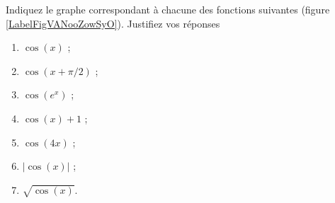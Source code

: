 
\begin{exercice}\label{exostarterST-0007}


Indiquez le graphe correspondant à chacune des fonctions suivantes (figure \ref{LabelFigVANooZowSyO}). Justifiez vos réponses
  \begin{multicols}{3}
    \begin{enumerate}
    \item $\cos (x) $ ;
    \item $\cos (x+\pi/2) $ ;
    \item $\cos(e^x) $ ;
    \item $ \cos(x)+1$ ;
    \item $\cos (4x) $ ; 
    \item $ |\cos(x)|$ ;
    \item $ \sqrt{\cos(x)}$.
    \end{enumerate}
  \end{multicols}

\newcommand{\CaptionFigVANooZowSyO}{Les graphes à considérer de la question \ref{exostarterST-0007}.}



\end{exercice}
